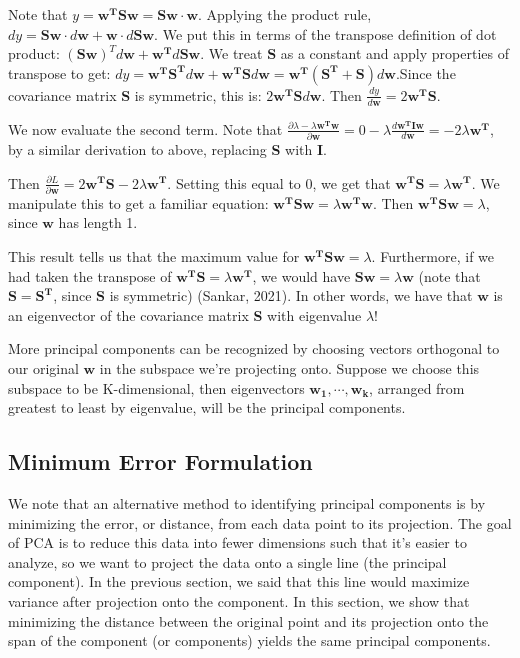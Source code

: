 \documentclass{article}
\begin{document}
\vspace{2mm}
\noindent Note that $y = \mathbf{w^{T}Sw} = \mathbf{Sw \cdot w}$. Applying the product rule, $dy = \mathbf{Sw} \cdot d\mathbf{w} + \mathbf{w} \cdot d\mathbf{Sw}$. We put this in terms of the transpose definition of dot product: $\mathbf{(Sw)}^{T}d\mathbf{w} + \mathbf{w^{T}}d\mathbf{Sw}$. We treat $\mathbf{S}$ as a constant and apply properties of transpose to get: $dy = \mathbf{w^{T}S^{T}}d\mathbf{w} + \mathbf{w^{T}S}d\mathbf{w} = \mathbf{w^{T}(S^{T}+S)}d\mathbf{w}$.Since the covariance matrix $\mathbf{S}$ is symmetric, this is: $2\mathbf{w^{T}S}d\mathbf{w}$. Then $\frac{dy}{d\mathbf{w}} = 2\mathbf{w^{T}S}$.

\vspace{2mm}
\noindent We now evaluate the second term. Note that $\frac{\partial \lambda - \lambda \mathbf{w^{T}w}}{\partial \mathbf{w}} = 0 - \lambda \frac{d\mathbf{w^{T}Iw}}{d\mathbf{w}} = -2\lambda \mathbf{w^{T}}$, by a similar derivation to above, replacing \textbf{S} with \textbf{I}.

\vspace{2mm}
\noindent Then $\frac{\partial L}{\partial \mathbf{w}} = 2\mathbf{w^{T}S} - 2\lambda \mathbf{w^{T}}$. Setting this equal to 0, we get that $\mathbf{w^{T}S} = \lambda \mathbf{w^{T}}$. We manipulate this to get a familiar equation: $\mathbf{w^{T}Sw} = \lambda \mathbf{w^{T}w}$. Then $\mathbf{w^{T}Sw} = \lambda$, since $\mathbf{w}$ has length 1.

\vspace{2mm}
\noindent This result tells us that the maximum value for $\mathbf{w^{T}Sw} = \lambda$. Furthermore, if we had taken the transpose of $\mathbf{w^{T}S} = \lambda \mathbf{w^T}$, we would have $\mathbf{Sw} = \lambda \mathbf{w}$ (note that $\mathbf{S = S^T}$, since $\mathbf{S}$ is symmetric) (Sankar, 2021). In other words, we have that $\mathbf{w}$ is an eigenvector of the covariance matrix \textbf{S} with eigenvalue $\lambda$!

\vspace{2mm}
\noindent More principal components can be recognized by choosing vectors orthogonal to our original $\mathbf{w}$ in the subspace we're projecting onto. Suppose we choose this subspace to be K-dimensional, then eigenvectors $\mathbf{w_1, \cdots, w_k}$, arranged from greatest to least by eigenvalue, will be the principal components.

\subsection{Minimum Error Formulation}
We note that an alternative method to identifying principal components is by minimizing the error, or distance, from each data point to its projection. The goal of PCA is to reduce this data into fewer dimensions such that it's easier to analyze, so we want to project the data onto a single line (the principal component). In the previous section, we said that this line would maximize variance after projection onto the component. In this section, we show that minimizing the distance between the original point and its projection onto the span of the component (or components) yields the same principal components.
\end{document}
